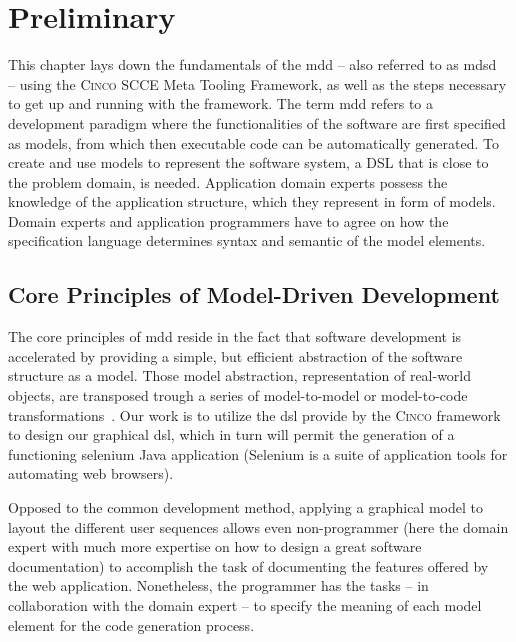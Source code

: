 
\chapter{Preliminary}\label{ch:Basis}

This chapter lays down the fundamentals of the \acrfull{mdd} -- also referred to as \acrfull{mdsd}~\cite{fowler} --  using the \textsc{Cinco} SCCE Meta Tooling Framework, as well as the steps necessary to get up and running with the framework. The term \acrshort{mdd} refers to a development paradigm where the functionalities of the software are first specified as models, from which then executable code can be automatically generated. To create and use models to represent the software system, a DSL that is close to the problem domain, is needed. Application domain experts possess the knowledge of the application structure, which they represent in form of models. Domain experts and application programmers have to agree on how the specification language determines syntax and semantic of the model elements.

\section{Core Principles of Model-Driven Development}

The core principles of \acrshort{mdd} reside in the fact that software development is accelerated by providing a simple, but efficient abstraction of the software structure as a model. Those model abstraction, representation of real-world objects, are transposed trough a series of model-to-model or model-to-code transformations~\cite{stahl_et_al}. Our work is to utilize the \acrshort{dsl} provide by the \textsc{Cinco} framework to design our graphical \acrshort{dsl}, which in turn will permit the generation of a functioning \gls{selenium} Java application (Selenium is a suite of application tools for automating web browsers).

Opposed to the common development method, applying a graphical model to layout the different user sequences allows even non-programmer (here the domain expert with much more expertise on how to design a great software documentation) to accomplish the task of documenting the features offered by the web application. Nonetheless, the programmer has the tasks -- in collaboration with the domain expert -- to specify the meaning of each model element for the code generation process. 

